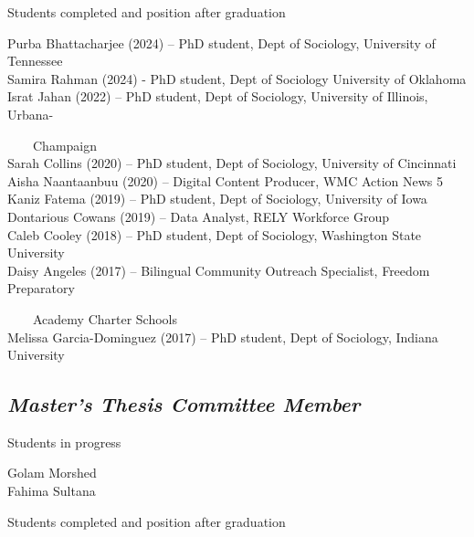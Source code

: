 \documentclass[11pt,]{article}
\begin{document}
\setlength{\leftskip}{0.5cm}

Students completed and position after graduation

\setlength{\leftskip}{0cm}
\setlength{\leftskip}{1cm}

Purba Bhattacharjee (2024) -- PhD student, Dept of Sociology, University
of Tennessee\\
Samira Rahman (2024) - PhD student, Dept of Sociology University of
Oklahoma\\
Israt Jahan (2022) -- PhD student, Dept of Sociology, University of
Illinois, Urbana-\\
\strut ~~~~Champaign\\
Sarah Collins (2020) -- PhD student, Dept of Sociology, University of
Cincinnati\\
Aisha Naantaanbuu (2020) -- Digital Content Producer, WMC Action News
5\\
Kaniz Fatema (2019) -- PhD student, Dept of Sociology, University of
Iowa\\
Dontarious Cowans (2019) -- Data Analyst, RELY Workforce Group\\
Caleb Cooley (2018) -- PhD student, Dept of Sociology, Washington State
University\\
Daisy Angeles (2017) -- Bilingual Community Outreach Specialist, Freedom
Preparatory\\
\strut ~~~~Academy Charter Schools\\
Melissa Garcia-Dominguez (2017) -- PhD student, Dept of Sociology,
Indiana University

\setlength{\leftskip}{0cm}

\subsection{\texorpdfstring{\emph{Master's Thesis Committee
Member}}{Master's Thesis Committee Member}}\label{masters-thesis-committee-member}

\setlength{\leftskip}{0.5cm}

Students in progress

\setlength{\leftskip}{0cm}
\setlength{\leftskip}{1cm}

Golam Morshed\\
Fahima Sultana

\setlength{\leftskip}{0cm}

\setlength{\leftskip}{0.5cm}

Students completed and position after graduation

\setlength{\leftskip}{0cm}
\setlength{\leftskip}{1cm}
\end{document}
